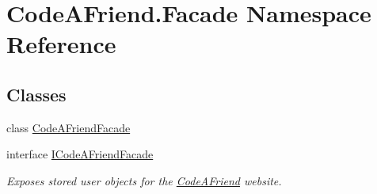 \hypertarget{namespace_code_a_friend_1_1_facade}{}\section{Code\+A\+Friend.\+Facade Namespace Reference}
\label{namespace_code_a_friend_1_1_facade}
\subsection*{Classes}
\begin{DoxyCompactItemize}
\item 
class \mbox{\hyperlink{class_code_a_friend_1_1_facade_1_1_code_a_friend_facade}{Code\+A\+Friend\+Facade}}
\item 
interface \mbox{\hyperlink{interface_code_a_friend_1_1_facade_1_1_i_code_a_friend_facade}{I\+Code\+A\+Friend\+Facade}}
\begin{DoxyCompactList}\small\item\em Exposes stored user objects for the \mbox{\hyperlink{namespace_code_a_friend}{Code\+A\+Friend}} website. \end{DoxyCompactList}\end{DoxyCompactItemize}
